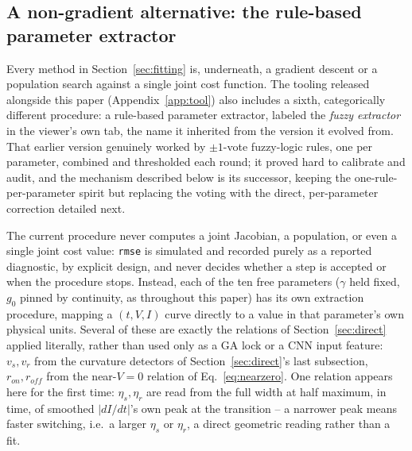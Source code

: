 \documentclass[11pt]{article}
\begin{document}
\subsection{A non-gradient alternative: the rule-based parameter extractor}
\label{sec:fuzzy}

Every method in Section~\ref{sec:fitting} is, underneath, a gradient
descent or a population search against a single joint cost function. The
tooling released alongside this paper (Appendix~\ref{app:tool}) also
includes a sixth, categorically different procedure: a rule-based
parameter extractor, labeled the \emph{fuzzy extractor} in the viewer's
own tab, the name it inherited from the version it evolved from. That
earlier version genuinely worked by $\pm1$-vote fuzzy-logic rules, one
per parameter, combined and thresholded each round; it proved hard to
calibrate and audit, and the mechanism described below is its
successor, keeping the one-rule-per-parameter spirit but replacing the
voting with the direct, per-parameter correction detailed next.

The current procedure never computes a joint Jacobian, a population, or
even a single joint cost value: \texttt{rmse} is simulated and recorded
purely as a reported diagnostic, by explicit design, and never decides
whether a step is accepted or when the procedure stops. Instead, each of
the ten free parameters ($\gamma$ held fixed, $g_0$ pinned by
continuity, as throughout this paper) has its own extraction procedure,
mapping a $(t,V,I)$ curve directly to a value in that parameter's own
physical units. Several of these are exactly the relations of
Section~\ref{sec:direct} applied literally, rather than used only as a
GA lock or a CNN input feature: $v_s, v_r$ from the curvature detectors
of Section~\ref{sec:direct}'s last subsection, $r_{on}, r_{off}$ from
the near-$V{=}0$ relation of
Eq.~\eqref{eq:nearzero}. One relation appears here for the first time:
$\eta_s, \eta_r$ are read from the full width at half maximum, in time,
of smoothed $|dI/dt|$'s own peak at the transition -- a narrower peak
means faster switching, i.e.\ a larger $\eta_s$ or $\eta_r$, a direct
geometric reading rather than a fit.
\end{document}
